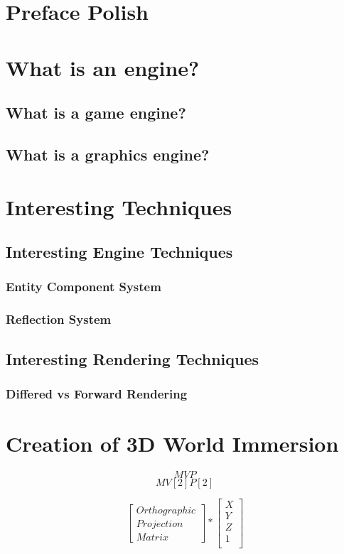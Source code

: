 \section{Preface Polish}  %
\newpage
\section{What is an engine?}
\subsection{What is a game engine?}
\subsection{What is a graphics engine?}

\newpage
\section{Interesting Techniques} %
\subsection{Interesting Engine Techniques}
\subsubsection{Entity Component System}
\label{sec:theory_ecs}
\subsubsection{Reflection System}
\label{sec:refl}

\newpage
\subsection{Interesting Rendering Techniques}
\subsubsection{Differed vs Forward Rendering}

\newpage
\section{Creation of 3D World Immersion}
\[MVP\]
\[MV[2]P[2]\]

\[
\begin{bmatrix}
Orthographic\\
Projection \\
Matrix
\end{bmatrix} 
*
\begin{bmatrix}
X\\
Y\\
Z\\
1\\
\end{bmatrix} 
\]

